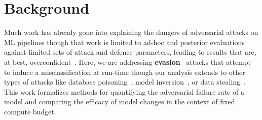 \section{Background}

Much work has already gone into explaining the dangers of adversarial attacks on ML pipelines \citep{carlini_towards_2017,croce_reliable_2020,pixelattack,fgm,biggio_evasion_2013} though that work is limited to ad-hoc and posterior evaluations against limited sets of attack and defence parameters, leading to results that are, at best, overconfident~\citep{meyers}. Here, we are addressing \textbf{evasion}~\citep{carlini_towards_2017} attacks that attempt to induce a misclassification at run-time though our analysis extends to other types of attacks like database poisoning~\citep{biggio_poisoning_2013, saha2020hidden}, model inversion~\citep{choquette2021label,li2021membership}, or data stealing~\citep{orekondy2019knockoff}. This work formalizes methods for quantifying the adversarial failure rate of a model and comparing the efficacy of model changes in the context of fixed compute budget.


